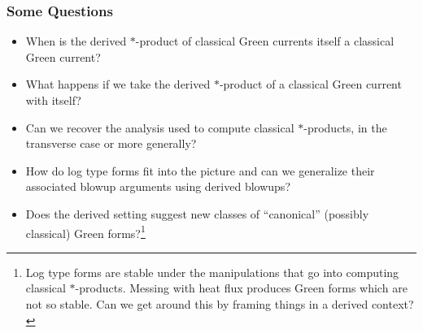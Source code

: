 \documentclass[11pt]{beamer}
\begin{document}
\begin{frame}
\frametitle{Some Questions}
\begin{itemize}
\item When is the derived $*$-product of classical Green currents itself a classical Green current?

\item What happens if we take the derived $*$-product of a classical Green current with itself?

\item Can we recover the analysis used to compute classical $*$-products, in the transverse case or more generally?

\item How do log type forms fit into the picture and can we generalize their associated blowup arguments using derived blowups?

\item Does the derived setting suggest new classes of ``canonical'' (possibly classical) Green forms?\footnote{Log type forms are stable under the manipulations that go into computing classical $*$-products. Messing with heat flux produces Green forms which are not so stable. Can we get around this by framing things in a derived context?}
\end{itemize}
\end{frame}
\end{document}
